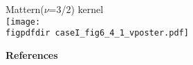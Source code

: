 \documentclass[landscape,a1,final]{a0poster} %
\def\figpdfdir{fig/} %
\begin{document}
\begin{minipage}{1\linewidth}
\begin{minipage}[t]{0.31\textwidth}
\begin{minipage}[t]{0.49\textwidth}
\begin{minipage}[t]{0.45\textwidth}
\end{minipage}
\begin{minipage}[t]{0.50\textwidth}
\vspace{-0.5cm}
\hspace{0.25\textwidth}  {\tiny Mattern($\nu$=3/2) kernel}\\
\texttt{[image: \\figpdfdir caseI\_fig6\_4\_1\_vposter.pdf]}

\end{minipage}

\end{minipage}


\vspace*{3mm}
{\centering\textbf{References}}
\renewcommand{\bibsection}{}
{\tiny %


} %


\end{minipage} %
\hspace{0.02\linewidth} 
\end{minipage} %


%



\end{document}
